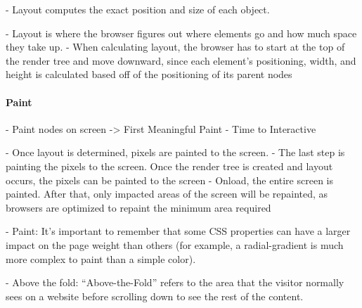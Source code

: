 - Layout computes the exact position and size of each object.


- Layout is where the browser figures out where elements go and how much space they take up.
- When calculating layout, the browser has to start at the top of the render tree and move downward, since each element’s positioning, width, and height is calculated based off of the positioning of its parent nodes






\paragraph{Paint}

- Paint nodes on screen
-> First Meaningful Paint
- Time to Interactive


- Once layout is determined, pixels are painted to the screen.
- The last step is painting the pixels to the screen. Once the render tree is created and layout occurs, the pixels can be painted to the screen
- Onload, the entire screen is painted. After that, only impacted areas of the screen will be repainted, as browsers are optimized to repaint the minimum area required


- Paint: It’s important to remember that some CSS properties can have a larger impact on the page weight than others (for example, a radial-gradient is much more complex to paint than a simple color).


- Above the fold: “Above-the-Fold” refers to the area that the visitor normally sees on a website before scrolling down to see the rest of the content. 






